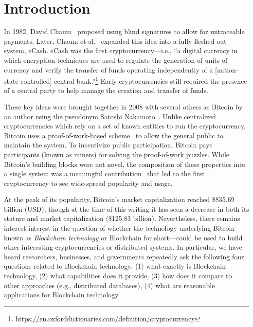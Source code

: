 
\section{Introduction}
In 1982, David Chaum~\cite{Cha82} proposed using blind signatures to allow for untraceable payments.
Later, Chaum et al.~\cite{chaum1988untraceable} expanded this idea into a fully fleshed out system, eCash.
eCash was the first cryptocurrency---i.e., ``a digital currency in which encryption techniques are used to regulate the generation of units of currency and verify the transfer of funds operating independently of a [nation-state-controlled] central bank.''\footnote{\url{https://en.oxforddictionaries.com/definition/cryptocurrency}}
Early cryptocurrencies still required the presence of a central party to help manage the creation and transfer of funds.

These key ideas were brought together in 2008 with several others as Bitcoin by an author using the pseudonym Satoshi Nakamoto~\cite{Nak08}. Unlike centralized cryptocurrencies which rely on a set of known entities to run the cryptocurrency, Bitcoin uses a proof-of-work-based scheme~\cite{DN93,back1997partial} to allow the general public to maintain the system.
To incentivize public participation, Bitcoin pays participants (known as miners) for solving the proof-of-work puzzles.
While Bitcoin's building blocks were not novel, the composition of these properties into a single system was a meaningful contribution~\cite{Narayanan17} that led to the first cryptocurrency to see wide-spread popularity and usage.

At the peak of its popularity, Bitcoin's market capitalization reached \$835.69 billion (USD), though at the time of this writing it has seen a decrease in both its stature and market capitalization (\$125.83 billion).
Nevertheless, there remains interest interest in the question of whether the technology underlying Bitcoin---known as \emph{Blockchain technology} or {Blockchain} for short---could be used to build other interesting cryptocurrencies or distributed systems.
In particular, we have heard researchers, businesses, and governments repeatedly ask the following four questions related to Blockchain technology: (1) what exactly is Blockchain technology, (2) what capabilities does it provide, (3) how does it compare to other approaches (e.g., distributed databases), (4) what are reasonable applications for Blockchain technology.

